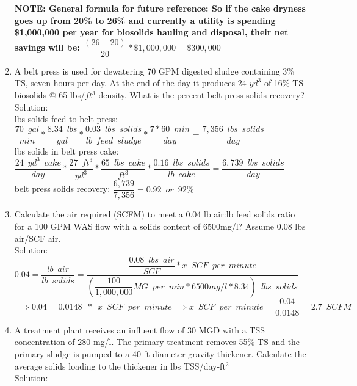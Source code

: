 \documentclass{article}
\begin{document}
\begin{enumerate}
\textbf {NOTE:  General formula for future reference: So if the cake dryness goes up from 20\% to 26\% and currently a utility is spending \$1,000,000 per year for biosolids hauling and disposal, their net savings will be: $\dfrac{(26-20)}{20}*\$1,000,000 = \$300,000$}
\\
\item A belt press is used for dewatering 70 GPM digested sludge containing 3\% TS, seven hours per day.  At the end of the day it produces 24 $yd^3$ of 16\% TS \enspace biosolids @ 65 lbs/$ft^3$ density.  What is the percent belt press solids recovery?\\
Solution:\\
lbs solids feed to belt press:  $\dfrac{70 \enspace gal}{min}*\dfrac{8.34 \enspace lbs}{gal}*
\dfrac{0.03 \enspace lbs \enspace solids}{lb \enspace feed \enspace sludge}*\dfrac{7*60 \enspace min}{day}=\dfrac{7,356 \enspace lbs \enspace solids}{day}$\\
\vspace{0.5cm}
lbs solids in belt press cake: $\dfrac{24 \enspace yd^3 \enspace cake}{day}*\dfrac{27 \enspace ft^3}{yd^3}*\dfrac{65 \enspace lbs \enspace cake}{ft^3}*\dfrac{0.16 \enspace lbs \enspace solids}{lb \enspace cake}=\dfrac{6,739 \enspace lbs \enspace solids}{day}$\\
\vspace{0.5cm}
belt press solids recovery: $\dfrac{6,739}{7,356}=\boxed{0.92 \enspace or \enspace 92\%}$


\item Calculate the air required (SCFM) to meet a 0.04 lb air:lb feed solids ratio for a 100 GPM WAS flow with a solids content of 6500mg/l? Assume 0.08 lbs air/SCF air.\\
Solution:\\
$0.04=\dfrac{lb \enspace air}{lb \enspace solids}=\dfrac{\dfrac{0.08 \enspace lbs  \enspace air}{SCF}*x \enspace SCF \enspace per \enspace  minute}{(\dfrac{100}{1,000,000}MG \enspace per \enspace min*6500mg/l*8.34) \enspace lbs  \enspace solids}$\\
\vspace{0.5cm}
$\implies0.04=0.0148 \enspace *\enspace x \enspace SCF \enspace per \enspace  minute \implies x \enspace SCF \enspace per \enspace  minute =\dfrac{0.04}{0.0148}=\boxed{2.7 \enspace SCFM}$

\item A treatment plant receives an influent flow of 30 MGD with a TSS concentration of 280 mg/l.  The primary treatment removes 55\% TS and the primary sludge is pumped to a 40 ft diameter gravity thickener.  Calculate the average solids loading to the thickener in lbs TSS/day-ft$^2$\\
Solution:\\
 

\end{enumerate}
\end{document}
